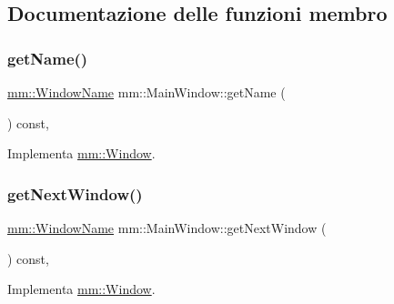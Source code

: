 \subsection{Documentazione delle funzioni membro}
\mbox{\label{classmm_1_1_main_window_a8cfdfeb6ad47afff06fa6b1b7fdc0c88}} 
\subsubsection{\texorpdfstring{get\+Name()}{getName()}}
{\footnotesize\ttfamily \hyperlink{namespacemm_a4e9d92e04f65dbf2fc1963947da0d93c}{mm\+::\+Window\+Name} mm\+::\+Main\+Window\+::get\+Name (\begin{DoxyParamCaption}{ }\end{DoxyParamCaption}) const\hspace{0.3cm}{\ttfamily [override]}, {\ttfamily [virtual]}}



Implementa \hyperlink{classmm_1_1_window_a942c9125bf42156a9f7b7f561e412fed}{mm\+::\+Window}.

\mbox{\label{classmm_1_1_main_window_aa1511ad7bed8d47cd35415d0a3a1161e}} 
\subsubsection{\texorpdfstring{get\+Next\+Window()}{getNextWindow()}}
{\footnotesize\ttfamily \hyperlink{namespacemm_a4e9d92e04f65dbf2fc1963947da0d93c}{mm\+::\+Window\+Name} mm\+::\+Main\+Window\+::get\+Next\+Window (\begin{DoxyParamCaption}{ }\end{DoxyParamCaption}) const\hspace{0.3cm}{\ttfamily [override]}, {\ttfamily [virtual]}}



Implementa \hyperlink{classmm_1_1_window_a0cd7b4b0feb9505c44503547a161fcd8}{mm\+::\+Window}.

\mbox{\label{classmm_1_1_main_window_a1094273a8ac991a50e4612efa8174fdd}} 
